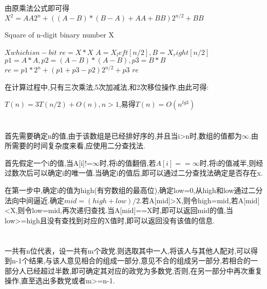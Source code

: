 \documentclass[12pt,a4paper]{ctexart}
\begin{document}
由原乘法公式即可得$X^2=AA2^n+((A-B)*(B-A)+AA+BB)2^{n/2}+BB$

\begin{algorithm}
    \renewcommand{\algorithmicrequire}{\textbf{Input:}}
    \renewcommand{\algorithmicensure}{\textbf{Output:}}
    \caption{Square of n-digit binary number X}
    \label{alg1}
    \begin{algorithmic}
        \Require $X which is n-bit$
        \State $re=X*X$
        \Else
        \State $A=X_left[n/2],B=X_right[n/2]$
        \State $p1=A*A,p2=(A-B)*(A-B),p3=B*B$
        \State $re=p1*2^n+(p1+p3-p2)2^{n/2}+p3$
        \EndIf
        \Ensure $re$
    \end{algorithmic}
\end{algorithm}

在计算过程中,只有三次乘法,5次加减法,和2次移位操作,由此可得:

$T(n)=3T(n/2)+O(n),n>1$,易得$T(n)=O(n^{lg3})$
\section{}
首先需要确定n的值,由于该数组是已经排好序的,并且当i>n时,数组的值都为$\infty$.由所需要的时间复杂度来看,应使用二分查找法.

首先假定一个i的值,当A[i]!=$\infty$时,将i的值翻倍,若$A[i]==\infty$时,将i的值减半,则经过数次后可以确定i的唯一值.当确定i的值后,即可以通过二分查找法确定是否存在x.

在第一步中,确定i的值为high(有穷数组的最高位),确定low=0,从high和low通过二分法向中间逼近.确定$mid=(high+low)/2.$若A[mid]>X,则令high=mid,若A[mid]<X,则令low=mid,再次递归查找.当A[mid]==X时,即可以返回mid的值,当low>=high且没有查找到对应的X值时,即可以返回没有该值的信息.

\section{}
一共有n位代表，设一共有m个政党.则选取其中一人,将该人与其他人配对,可以得到n-1个结果,与该人意见相合的组成一部分,意见不合的组成另一部分,若相合的一部分人已经超过半数,即可确定其对应的政党为多数党,否则,在另一部分中再次重复操作,直至选出多数党或者m>=n-1.
\end{document}
